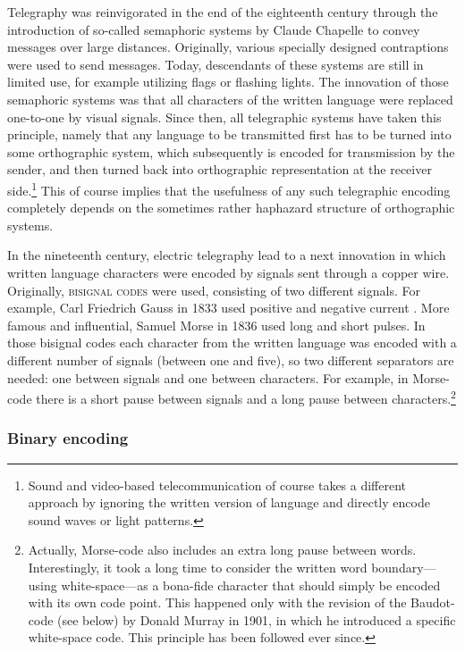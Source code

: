 Telegraphy was reinvigorated in the end of the eighteenth century through the
introduction of so-called semaphoric systems by Claude Chapelle to convey
messages over large distances. Originally, various specially designed
contraptions were used to send messages. Today, descendants of these systems are
still in limited use, for example utilizing flags or flashing lights. The
innovation of those semaphoric systems was that all characters of the
written language were replaced one-to-one by visual signals. Since then, all
telegraphic systems have taken this principle, namely that any language to be
transmitted first has to be turned into some orthographic system, which
subsequently is encoded for transmission by the sender, and then turned back
into orthographic representation at the receiver side.\footnote{Sound and
video-based telecommunication of course takes a different approach by ignoring
the written version of language and directly encode sound waves or light
patterns.} This of course implies that the usefulness of any such telegraphic
encoding completely depends on the sometimes rather haphazard structure of
orthographic systems.

In the nineteenth century, electric telegraphy lead to a next innovation in
which written language characters were encoded by signals sent through a copper
wire. Originally, \textsc{bisignal codes} were used, consisting of two different
signals. For example, Carl Friedrich Gauss in 1833 used positive and negative
current \citep[282]{Mania2008}. More famous and influential, Samuel Morse in
1836 used long and short pulses. In those bisignal codes each character from the
written language was encoded with a different number of signals (between one and
five), so two different separators are needed: one between signals and one
between characters. For example, in Morse-code there is a short pause between
signals and a long pause between characters.\footnote{Actually, Morse-code also
includes an extra long pause between words. Interestingly, it took a long time
to consider the written word boundary---using white-space---as a bona-fide
character that should simply be encoded with its own code point. This happened
only with the revision of the Baudot-code (see below) by Donald Murray in 1901,
in which he introduced a specific white-space code. This principle has been
followed ever since.}

\subsubsection*{Binary encoding}

